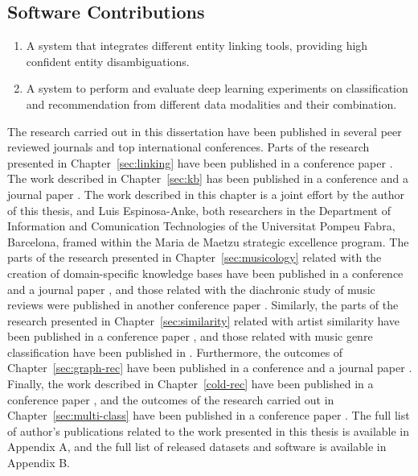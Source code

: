 \subsection{Software Contributions}

\begin{enumerate}
\item
A system that integrates different entity linking tools, providing high confident entity disambiguations.

\item
A system to perform and evaluate deep learning experiments on classification and recommendation from different data modalities and their combination. %

\end{enumerate}

The research carried out in this dissertation have been published in several peer reviewed journals and top international conferences. Parts of the research presented in Chapter~\ref{sec:linking} have been published in a conference paper \cite{Oramas2016}. The work described in Chapter~\ref{sec:kb} has been published in a conference and a journal paper \cite{Oramas2015,Oramas2016a}. The work described in this chapter is a joint effort by the author of this thesis, and Luis Espinosa-Anke, both researchers in the Department of Information and Comunication Technologies of the Universitat Pompeu Fabra, Barcelona, framed within the Maria de Maetzu strategic excellence program. The parts of the research presented in Chapter~\ref{sec:musicology} related with the creation of domain-specific knowledge bases have been published in a conference and a journal paper \cite{Oramas2015b,}, and those related with the diachronic study of music reviews were published in another conference paper \cite{oramas2016exploring}. Similarly, the parts of the research presented in Chapter~\ref{sec:similarity} related with artist similarity have been published in a conference paper \cite{Oramas2015a}, and those related with music genre classification have been published in \cite{oramas2016exploring}. Furthermore, the outcomes of Chapter~\ref{sec:graph-rec} have been published in a conference and a journal paper \cite{Ostuni2015,oramas2016sound}. Finally, the work described in Chapter~\ref{cold-rec} have been published in a conference paper \cite{}, and the outcomes of the research carried out in Chapter~\ref{sec:multi-class} have been published in a conference paper \cite{}. The full list of author's publications related to the work presented in this thesis is available in Appendix A, and the full list of released datasets and software is available in Appendix B.


